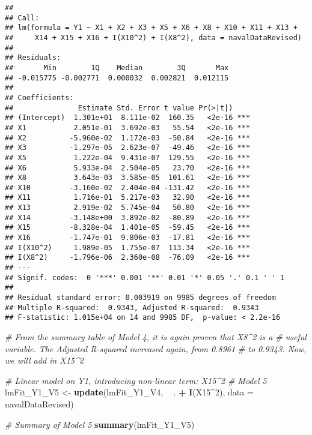 \documentclass[
]{article}
\newenvironment{Shaded}{\begin{snugshade}}{\end{snugshade}}
\newcommand{\CommentTok}[1]{\textcolor[rgb]{0.56,0.35,0.01}{\textit{#1}}}
\newcommand{\DataTypeTok}[1]{\textcolor[rgb]{0.13,0.29,0.53}{#1}}
\newcommand{\DecValTok}[1]{\textcolor[rgb]{0.00,0.00,0.81}{#1}}
\newcommand{\KeywordTok}[1]{\textcolor[rgb]{0.13,0.29,0.53}{\textbf{#1}}}
\newcommand{\NormalTok}[1]{#1}
\newcommand{\OperatorTok}[1]{\textcolor[rgb]{0.81,0.36,0.00}{\textbf{#1}}}
\newcommand{\StringTok}[1]{\textcolor[rgb]{0.31,0.60,0.02}{#1}}
\begin{document}
\begin{verbatim}
## 
## Call:
## lm(formula = Y1 ~ X1 + X2 + X3 + X5 + X6 + X8 + X10 + X11 + X13 + 
##     X14 + X15 + X16 + I(X10^2) + I(X8^2), data = navalDataRevised)
## 
## Residuals:
##       Min        1Q    Median        3Q       Max 
## -0.015775 -0.002771  0.000032  0.002821  0.012115 
## 
## Coefficients:
##               Estimate Std. Error t value Pr(>|t|)    
## (Intercept)  1.301e+01  8.111e-02  160.35   <2e-16 ***
## X1           2.051e-01  3.692e-03   55.54   <2e-16 ***
## X2          -5.960e-02  1.172e-03  -50.84   <2e-16 ***
## X3          -1.297e-05  2.623e-07  -49.46   <2e-16 ***
## X5           1.222e-04  9.431e-07  129.55   <2e-16 ***
## X6           5.933e-04  2.504e-05   23.70   <2e-16 ***
## X8           3.643e-03  3.585e-05  101.61   <2e-16 ***
## X10         -3.160e-02  2.404e-04 -131.42   <2e-16 ***
## X11          1.716e-01  5.217e-03   32.90   <2e-16 ***
## X13          2.919e-02  5.745e-04   50.80   <2e-16 ***
## X14         -3.148e+00  3.892e-02  -80.89   <2e-16 ***
## X15         -8.328e-04  1.401e-05  -59.45   <2e-16 ***
## X16         -1.747e-01  9.806e-03  -17.81   <2e-16 ***
## I(X10^2)     1.989e-05  1.755e-07  113.34   <2e-16 ***
## I(X8^2)     -1.796e-06  2.360e-08  -76.09   <2e-16 ***
## ---
## Signif. codes:  0 '***' 0.001 '**' 0.01 '*' 0.05 '.' 0.1 ' ' 1
## 
## Residual standard error: 0.003919 on 9985 degrees of freedom
## Multiple R-squared:  0.9343, Adjusted R-squared:  0.9343 
## F-statistic: 1.015e+04 on 14 and 9985 DF,  p-value: < 2.2e-16
\end{verbatim}

\begin{Shaded}
\begin{Highlighting}[]
\CommentTok{# From the summary table of Model 4, it is again proven that X8^2 is a}
\CommentTok{# useful variable. The Adjusted R-squared increased again, from 0.8961}
\CommentTok{# to 0.9343. Now, we will add in X15^2}

\CommentTok{# Linear model on Y1, introducing non-linear term: X15^2}
\CommentTok{# Model 5}
\NormalTok{lmFit_Y1_V5 <-}\StringTok{ }\KeywordTok{update}\NormalTok{(lmFit_Y1_V4, }\OperatorTok{~}\StringTok{ }\NormalTok{. }\OperatorTok{+}\StringTok{ }\KeywordTok{I}\NormalTok{(X15}\OperatorTok{^}\DecValTok{2}\NormalTok{), }\DataTypeTok{data =}\NormalTok{ navalDataRevised)}

\CommentTok{# Summary of Model 5}
\KeywordTok{summary}\NormalTok{(lmFit_Y1_V5)}
\end{Highlighting}
\end{Shaded}
\end{document}
